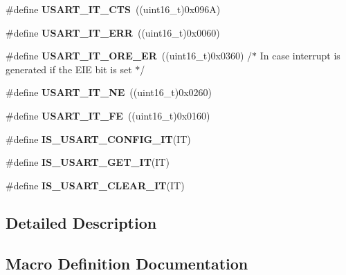 \begin{DoxyCompactItemize}
\item 
\hypertarget{group___u_s_a_r_t___interrupt__definition_gab49efbefaca2921e8cbe8f5146e99dbd}{}\#define {\bfseries U\+S\+A\+R\+T\+\_\+\+I\+T\+\_\+\+C\+T\+S}~((uint16\+\_\+t)0x096\+A)\label{group___u_s_a_r_t___interrupt__definition_gab49efbefaca2921e8cbe8f5146e99dbd}

\item 
\hypertarget{group___u_s_a_r_t___interrupt__definition_ga631e83efd4c4789128d80a9539faf78a}{}\#define {\bfseries U\+S\+A\+R\+T\+\_\+\+I\+T\+\_\+\+E\+R\+R}~((uint16\+\_\+t)0x0060)\label{group___u_s_a_r_t___interrupt__definition_ga631e83efd4c4789128d80a9539faf78a}

\item 
\hypertarget{group___u_s_a_r_t___interrupt__definition_ga1faa2d618b7c1038f8cad50fec7d0ba4}{}\#define {\bfseries U\+S\+A\+R\+T\+\_\+\+I\+T\+\_\+\+O\+R\+E\+\_\+\+E\+R}~((uint16\+\_\+t)0x0360) /$\ast$ In case interrupt is generated if the E\+I\+E bit is set $\ast$/\label{group___u_s_a_r_t___interrupt__definition_ga1faa2d618b7c1038f8cad50fec7d0ba4}

\item 
\hypertarget{group___u_s_a_r_t___interrupt__definition_gad5de042f579b50f1e8643009176486b3}{}\#define {\bfseries U\+S\+A\+R\+T\+\_\+\+I\+T\+\_\+\+N\+E}~((uint16\+\_\+t)0x0260)\label{group___u_s_a_r_t___interrupt__definition_gad5de042f579b50f1e8643009176486b3}

\item 
\hypertarget{group___u_s_a_r_t___interrupt__definition_ga9af8790f78f6cb1591506c57d0cc0fb3}{}\#define {\bfseries U\+S\+A\+R\+T\+\_\+\+I\+T\+\_\+\+F\+E}~((uint16\+\_\+t)0x0160)\label{group___u_s_a_r_t___interrupt__definition_ga9af8790f78f6cb1591506c57d0cc0fb3}

\item 
\#define {\bfseries I\+S\+\_\+\+U\+S\+A\+R\+T\+\_\+\+C\+O\+N\+F\+I\+G\+\_\+\+I\+T}(I\+T)
\item 
\#define {\bfseries I\+S\+\_\+\+U\+S\+A\+R\+T\+\_\+\+G\+E\+T\+\_\+\+I\+T}(I\+T)
\item 
\#define {\bfseries I\+S\+\_\+\+U\+S\+A\+R\+T\+\_\+\+C\+L\+E\+A\+R\+\_\+\+I\+T}(I\+T)
\end{DoxyCompactItemize}


\subsection{Detailed Description}


\subsection{Macro Definition Documentation}
\hypertarget{group___u_s_a_r_t___interrupt__definition_ga3ceda175140b84eea02a2261ebda4efd}{}
